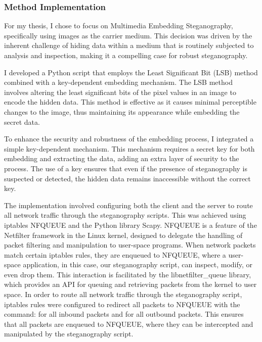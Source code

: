 \documentclass[12pt, fleqn, a4paper]{article}
\begin{document}
\subsubsection{Method Implementation}
For my thesis, I chose to focus on Multimedia Embedding Steganography, specifically using images as the carrier medium. This decision was driven by the inherent challenge of hiding data within a medium that is routinely subjected to analysis and inspection, making it a compelling case for robust steganography.

I developed a Python script that employs the Least Significant Bit (LSB) method combined with a key-dependent embedding mechanism. The LSB method involves altering the least significant bits of the pixel values in an image to encode the hidden data. This method is effective as it causes minimal perceptible changes to the image, thus maintaining its appearance while embedding the secret data.

To enhance the security and robustness of the embedding process, I integrated a simple key-dependent mechanism. This mechanism requires a secret key for both embedding and extracting the data, adding an extra layer of security to the process. The use of a key ensures that even if the presence of steganography is suspected or detected, the hidden data remains inaccessible without the correct key. \citep{stegokey}

The implementation involved configuring both the client and the server to route all network traffic through the steganography scripts. This was achieved using iptables NFQUEUE and the Python library Scapy. NFQUEUE is a feature of the Netfilter framework in the Linux kernel, designed to delegate the handling of packet filtering and manipulation to user-space programs. When network packets match certain iptables rules, they are enqueued to NFQUEUE, where a user-space application, in this case, our steganography script, can inspect, modify, or even drop them. This interaction is facilitated by the libnetfilter\_queue library, which provides an API for queuing and retrieving packets from the kernel to user space. In order to route all network traffic through the steganography script, iptables rules were configured to redirect all packets to NFQUEUE with the command:  for all inbound packets and  for all outbound packets. This ensures that all packets are enqueued to NFQUEUE, where they can be intercepted and manipulated by the steganography script.
\end{document}
